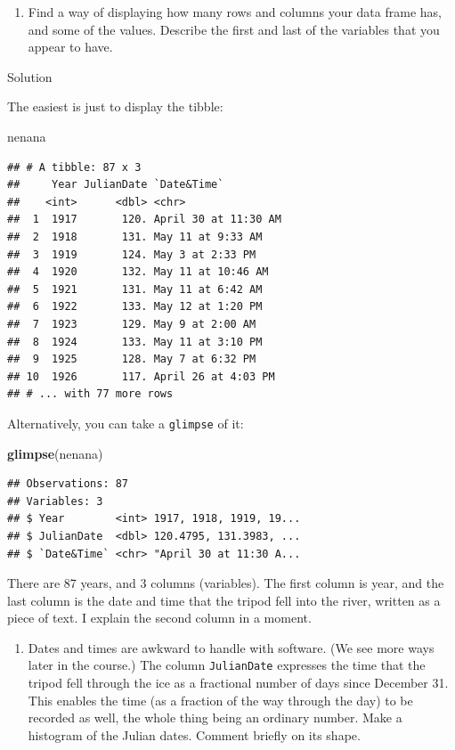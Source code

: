 \documentclass[]{tufte-book}
\newenvironment{Shaded}{}{}
\newcommand{\KeywordTok}[1]{\textcolor[rgb]{0.00,0.44,0.13}{\textbf{#1}}}
\newcommand{\NormalTok}[1]{#1}
\providecommand{\tightlist}{%
  \setlength{\itemsep}{0pt}\setlength{\parskip}{0pt}}
\theoremstyle{definition}
\theoremstyle{definition}
\theoremstyle{definition}
\theoremstyle{remark}
\begin{document}
\begin{enumerate}
\def\labelenumi{(\alph{enumi})}
\setcounter{enumi}{1}
\tightlist
\item
  Find a way of displaying how many rows and columns your data frame
  has, and some of the values. Describe the first and last of the
  variables that you appear to have.
\end{enumerate}

Solution

The easiest is just to display the tibble:

\begin{Shaded}
\begin{Highlighting}[]
\NormalTok{nenana}
\end{Highlighting}
\end{Shaded}

\begin{verbatim}
## # A tibble: 87 x 3
##     Year JulianDate `Date&Time`         
##    <int>      <dbl> <chr>               
##  1  1917       120. April 30 at 11:30 AM
##  2  1918       131. May 11 at 9:33 AM   
##  3  1919       124. May 3 at 2:33 PM    
##  4  1920       132. May 11 at 10:46 AM  
##  5  1921       131. May 11 at 6:42 AM   
##  6  1922       133. May 12 at 1:20 PM   
##  7  1923       129. May 9 at 2:00 AM    
##  8  1924       133. May 11 at 3:10 PM   
##  9  1925       128. May 7 at 6:32 PM    
## 10  1926       117. April 26 at 4:03 PM 
## # ... with 77 more rows
\end{verbatim}

Alternatively, you can take a \texttt{glimpse} of it:

\begin{Shaded}
\begin{Highlighting}[]
\KeywordTok{glimpse}\NormalTok{(nenana)}
\end{Highlighting}
\end{Shaded}

\begin{verbatim}
## Observations: 87
## Variables: 3
## $ Year        <int> 1917, 1918, 1919, 19...
## $ JulianDate  <dbl> 120.4795, 131.3983, ...
## $ `Date&Time` <chr> "April 30 at 11:30 A...
\end{verbatim}

There are 87 years, and 3 columns (variables). The first column is year,
and the last column is the date and time that the tripod fell into the
river, written as a piece of text. I explain the second column in a
moment.

\begin{enumerate}
\def\labelenumi{(\alph{enumi})}
\setcounter{enumi}{2}
\tightlist
\item
  Dates and times are awkward to handle with software. (We see more ways
  later in the course.) The column \texttt{JulianDate} expresses the
  time that the tripod fell through the ice as a fractional number of
  days since December 31. This enables the time (as a fraction of the
  way through the day) to be recorded as well, the whole thing being an
  ordinary number. Make a histogram of the Julian dates. Comment briefly
  on its shape.
\end{enumerate}
\end{document}
